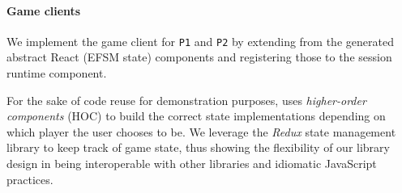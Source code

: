 \paragraph{Game clients}
We implement the game client for \texttt{P1} and
\texttt{P2} by extending from the generated abstract React (EFSM state)
components and registering those to the session runtime component.

For the sake of code reuse for demonstration purposes, \cite{NoughtsAndCrosses}
uses \textit{higher-order components} (HOC) to build the correct state
implementations depending on which player the user chooses to be.
We leverage the \textit{Redux} state management library to keep track of game
state, thus showing the flexibility of our library design in being
interoperable with other libraries and idiomatic JavaScript practices.

